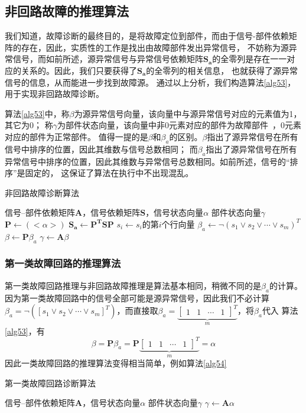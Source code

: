 \subsection{非回路故障的推理算法}
我们知道，故障诊断的最终目的，是将故障定位到部件，而由于信号-部件依赖矩阵的存在，因此，实质性的工作是找出由故障部件发出异常信号，
不妨称为源异常信号，而如前所述，源异常信号与异常信号依赖矩阵$\mathbf{S_a}$的全零列是存在一一对应的关系的。因此，我们只要获得了$\mathbf{S_a}$的全零列的相关信息，
也就获得了源异常信号的信息，从而能进一步找到故障源。
通过以上分析，我们构造算法\ref{alg53}，用于实现非回路故障诊断。

算法\ref{alg53}中，称$\beta$为源异常信号向量，该向量中与源异常信号对应的元素值为1，其它为0；
称$\gamma$为部件状态向量，该向量中非0元素对应的部件为故障部件~，0元素对应的部件为正常部件。
值得一提的是$\beta$和$\beta_a$的区别。$\beta$指出了源异常信号在所有信号中排序的位置，因此其维数与信号总数相同；
而$\beta_a$指出了源异常信号在所有异常信号中排序的位置，因此其维数与异常信号总数相同。如前所述，信号的“排序”是固定的，
这保证了算法在执行中不出现混乱。
\begin{algorithm}[htbp]
  \caption{非回路故障诊断算法}
  \label{alg53}
  \begin{algorithmic}[1]
    \REQUIRE 信号--部件依赖矩阵$\mathbf{A}$，信号依赖矩阵$\mathbf{S}$，信号状态向量$\alpha$
    \ENSURE 部件状态向量$\gamma$
    \STATE $\mathbf{P}\leftarrow\left(<\alpha>\right)$
    \STATE $\mathbf{S_{a}}\leftarrow\mathbf{P^T}\mathbf{S}\mathbf{P}$
    \STATE $s_i\leftarrow s_i$的第$i$个行向量
    \ENDFOR
    \STATE $\beta_a\leftarrow\lnot \left(s_1\lor s_2\lor \cdots\lor s_m\right)^T$
    \STATE $\beta\leftarrow\mathbf{P}\beta_a$
    \STATE $\gamma\leftarrow\mathbf{A}\beta$
  \end{algorithmic}
\end{algorithm}
\subsubsection{第一类故障回路的推理算法}
第一类故障回路推理与非回路故障推理是算法基本相同，稍微不同的是$\beta_a$的计算。因为第一类故障回路中的信号全部可能是源异常信号，因此我们不必计算
$\beta_a=\lnot \left(\left[s_1\lor s_2\lor \cdots\lor s_m\right]^T\right)$，而直接取$\beta_a=\underbrace{\left[\begin{array}{cccc}1&1&\cdots&1\end{array}\right]^T}_m$，将$\beta_a$代入
算法\ref{alg53}，有
\[\beta=\mathbf{P}\beta_a=\mathbf{P}\underbrace{\left[\begin{array}{cccc}1&1&\cdots&1\end{array}\right]^T}_m=\alpha\]
因此一类故障回路的推理算法变得相当简单，例如算法\ref{alg54}
\begin{algorithm}[htbp]
  \caption{第一类故障回路诊断算法}
  \label{alg54}
  \begin{algorithmic}[1]
    \REQUIRE 信号--部件依赖矩阵$\mathbf{A}$，信号状态向量$\alpha$
    \ENSURE 部件状态向量$\gamma$
    \STATE $\gamma\leftarrow\mathbf{A}\alpha$
  \end{algorithmic}
\end{algorithm}

